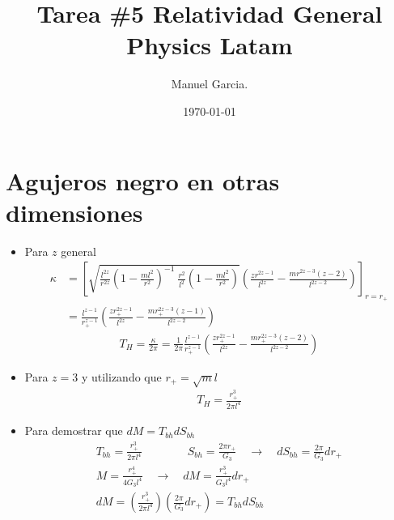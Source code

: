 \documentclass{article}
\title{Tarea \#5 Relatividad General Physics Latam }
\author{Manuel Garcia.}
\date{\today}
\begin{document}
\maketitle

\section{Agujeros negro en otras dimensiones }
\begin{itemize}
  \item 
    Para $ z  $ general 
    \begin{align*}
      \kappa &= \left[\sqrt{\frac{l ^ {2z }}{r ^ {2z }} \left(1 - \frac{ml^2 }{r^2 }\right)^ {-1} \ \frac{r^2 }{l^2 } \left(1 - \frac{ml^2 }{r^2}\right)} \left(\frac{z r ^ {2z-1 }}{l ^ {2z }} - \frac{m r ^ {2z-3 }(z-2)}{l ^ {2z-2}}\right) \right] _{r = r_+ } 
      \\
             &= \frac{l ^ {z - 1 }}{r_+ ^ {z - 1 }} \left(\frac{z r_+ ^ {2z-1 }}{l ^ {2z }} - \frac{m r_+ ^ {2z-3 }(z-1)}{l ^ {2z-2}}\right) 
    \end{align*}
    \begin{gather*}
      T_H = \frac{\kappa}{2\pi} = \frac{1}{2\pi} \frac{l ^ {z - 1 }}{r_+ ^ {z - 1 }} \left(\frac{z r_+ ^ {2z-1 }}{l ^ {2z }} - \frac{m r_+ ^ {2z-3 }(z-2)}{l ^ {2z-2}}\right)
    \end{gather*}
  \item 
    Para $ z = 3  $ y utilizando que $ r_+ = \sqrt{m } l $
    \begin{gather}
      T_H = \frac{r_+^3 }{2\pi l^4 }
    \end{gather} 
  \item 
    Para demostrar que $ dM = T_{bh} dS_{bh} $ 
    \begin{gather*}
      T_{bh} = \frac{r_+^3 }{2\pi l^4 } \qquad\qquad S _{bh } = \frac{2\pi r_+ }{G_3} \quad \rightarrow \quad dS _{bh }  = \frac{2\pi}{G_3 } dr_+ 
      \\
      M = \frac{r_+^4 }{4G_3 l^4 } \quad \rightarrow \quad dM = \frac{r_+^3 }{G_3 l^4 }dr_+ \\
      dM = \left(\frac{r_+^3 }{2\pi l^4 }\right) \left(\frac{2\pi }{G_3 } dr_+\right) = T _{bh } d S _{bh } 
    \end{gather*}
\end{itemize}
\end{document}
